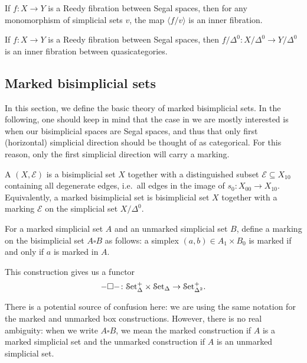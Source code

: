 \documentclass[main.tex]{subfiles}
\begin{document}
\begin{theorem}
  \label{thm:inner_fibration_between_quasicategories}
  If $f\colon X \to Y$ is a Reedy fibration between Segal spaces, then for any monomorphism of simplicial sets $v$, the map $\langle f / v \rangle$ is an inner fibration.
\end{theorem}

\begin{corollary}
  If $f\colon X \to Y$ is a Reedy fibration between Segal spaces, then $f / \Delta^{0}\colon X / \Delta^{0} \to Y / \Delta^{0}$ is an inner fibration between quasicategories.
\end{corollary}

\subsection{Marked bisimplicial sets}
\label{ssc:marked_bisimplicial_sets}

In this section, we define the basic theory of marked bisimplicial sets. In the following, one should keep in mind that the case in we are mostly interested is when our bisimplicial spaces are Segal spaces, and thus that only first (horizontal) simplicial direction should be thought of as categorical. For this reason, only the first simplicial direction will carry a marking.

\begin{definition}
  A  $(X, \mathcal{E})$ is a bisimplicial set $X$ together with a distinguished subset $\mathcal{E} \subseteq X_{10}$ containing all degenerate edges, i.e.\ all edges in the image of $s_{0}\colon X_{00} \to X_{10}$. Equivalently, a marked bisimplicial set is bisimplicial set $X$ together with a marking $\mathcal{E}$ on the simplicial set $X / \Delta^{0}$.
\end{definition}

\begin{definition}
  For a marked simplicial set $A$ and an unmarked simplicial set $B$, define a marking on the bisimplicial set $A \square B$ as follows: a simplex $(a, b) \in A_{1} \times B_{0}$ is marked if and only if $a$ is marked in $A$.
\end{definition}

This construction gives us a functor
\begin{equation*}
  - \square -  \colon \mathcal{S}\mathrm{et}_{\Delta}^{+} \times \mathcal{S}\mathrm{et}_{\Delta} \to \mathcal{S}\mathrm{et}_{\Delta^{2}}^{+}.
\end{equation*}

There is a potential source of confusion here: we are using the same notation for the marked and unmarked box constructions. However, there is no real ambiguity: when we write $A \square B$, we mean the marked construction if $A$ is a marked simplicial set and the unmarked construction if $A$ is an unmarked simplicial set.
\end{document}
